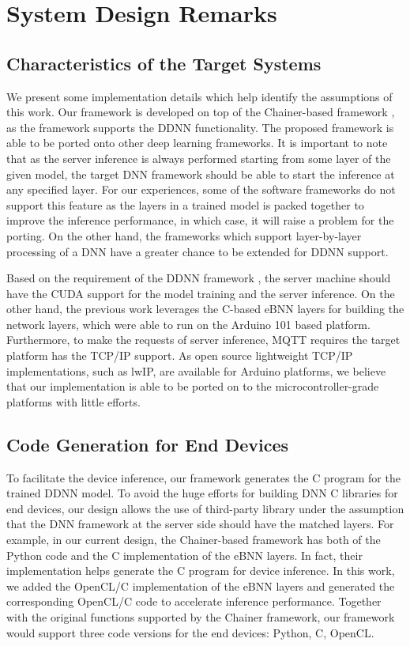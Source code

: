 \documentclass[format=acmsmall, review=false, screen=true]{acmart}
\begin{document}
\section{System Design Remarks}
\label{sec:remarks}

\subsection{Characteristics of the Target Systems}
\label{sec:assumptions}
We present some implementation details which help identify the assumptions of this work. Our framework is developed on top of the Chainer-based framework \cite{Teerapittayanon17}, as the framework supports the DDNN functionality. The proposed framework is able to be ported onto other deep learning frameworks. It is important to note that as the server inference is always performed starting from some layer of the given model, the target DNN framework should be able to start the inference at any specified layer. For our experiences, some of the software frameworks do not support this feature as the layers in a trained model is packed together to improve the inference performance, in which case, it will raise a problem for the porting. On the other hand, the frameworks which support layer-by-layer processing of a DNN have a greater chance to be extended for DDNN support.

Based on the requirement of the DDNN framework \cite{Teerapittayanon17}, the server machine should have the CUDA support for the model training and the server inference. On the other hand, the previous work leverages the C-based eBNN layers for building the network layers, which were able to run on the Arduino 101 based platform. Furthermore, to make the requests of server inference, MQTT requires the target platform has the TCP/IP support. As open source lightweight TCP/IP implementations, such as lwIP, are available for Arduino platforms, we believe that our implementation is able to be ported on to the microcontroller-grade platforms with little efforts.

\subsection{Code Generation for End Devices}
To facilitate the device inference, our framework generates the C program for the trained DDNN model. To avoid the huge efforts for building DNN C libraries for end devices, our design allows the use of third-party library under the assumption that the DNN framework at the server side should have the matched layers. For example, in our current design, the Chainer-based framework \cite{Teerapittayanon17} has both of the Python code and the C implementation of the eBNN layers. In fact, their implementation helps generate the C program for device inference. In this work, we added the OpenCL/C implementation of the eBNN layers and generated the corresponding OpenCL/C code to accelerate inference performance. Together with the original functions supported by the Chainer framework, our framework would support three code versions for the end devices: Python, C, OpenCL.
\end{document}
